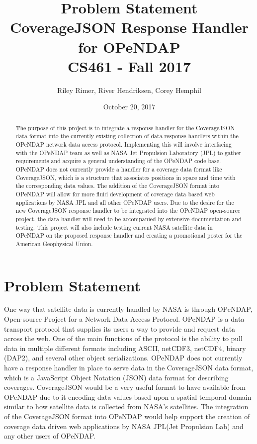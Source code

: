 \documentclass[letterpaper,10pt,draftclsnofoot,onecolumn]{IEEEtran}
\title{
Problem Statement\\ 
\large CoverageJSON Response Handler for OPeNDAP\\
\large CS461 -  Fall 2017\\
}
\author{Riley Rimer, River Hendriksen, Corey Hemphil}
\date{October 20, 2017}
\begin{document}
\begin{titlepage}

\maketitle
% 
% 
\centering

\begin{abstract}
The purpose of this project is to integrate a response handler for the CoverageJSON data format into the currently existing collection of data response handlers within the OPeNDAP network data access protocol. Implementing this will involve interfacing with the OPeNDAP team as well as NASA Jet Propulsion Laboratory (JPL) to gather requirements and acquire a general understanding of the OPeNDAP code base. OPeNDAP does not currently provide a handler for a coverage data format like CoverageJSON, which is a structure that associates positions in space and time with the corresponding data values. The addition of the CoverageJSON format into OPeNDAP will allow for more fluid development of coverage data based web applications by NASA JPL and all other OPeNDAP users. Due to the desire for the new CoverageJSON response handler to be integrated into the OPeNDAP open-source project, the data handler will need to be accompanied by extensive documentation and testing. This project will also include testing current NASA satellite data in OPeNDAP on the proposed response handler and creating a promotional poster for the American Geophysical Union.
\end{abstract}

\end{titlepage}

\section{Problem Statement}
One way that satellite data is currently handled by NASA is through OPeNDAP, Open-source Project for a Network Data Access Protocol. OPeNDAP is a data transport protocol that supplies its users a way to provide and request data across the web. One of the main functions of the protocol is the ability to pull data in multiple different formats including ASCII, netCDF3, netCDF4, binary (DAP2), and several other object serializations. OPeNDAP does not currently have a response handler in place to serve data in the CoverageJSON data format, which is a JavaScript Object Notation (JSON) data format for describing coverages. CoverageJSON would be a very useful format to have available from OPeNDAP due to it encoding data values based upon a spatial temporal domain similar to how satellite data is collected from NASA's satellites. The integration of the CoverageJSON format into OPeNDAP would help support the creation of coverage data driven web applications by NASA JPL(Jet Propulsion Lab) and any other users of OPeNDAP.
\end{document}
